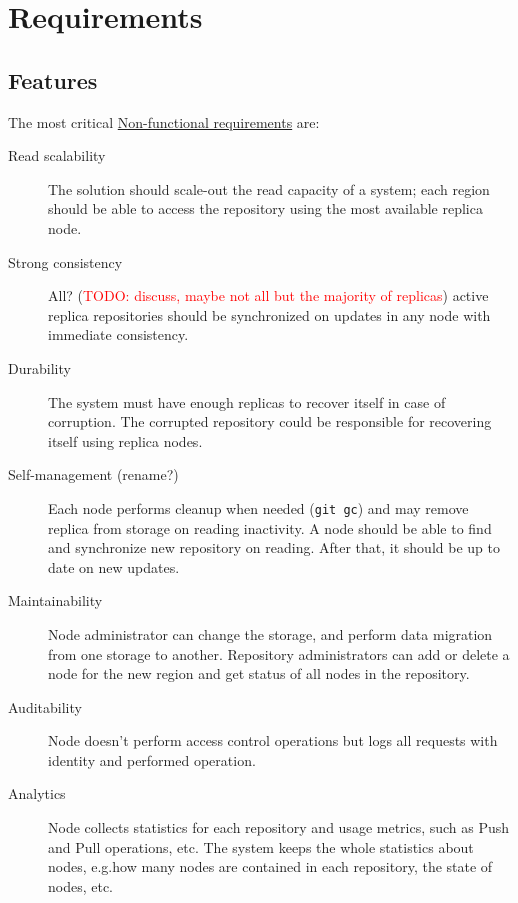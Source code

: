 \documentclass[acmlarge, screen, nonacm, 11pt]{acmart}
\newcommand{\code}[1]{\texttt{#1}}
\newcommand{\todo}[1]{\textcolor{red}{TODO: #1}}
\begin{document}


\section{Requirements}\label{sec:requirements}

\subsection{Features}\label{sec:features}

The most critical
\href{https://en.wikipedia.org/wiki/Non-functional_requirement}{Non-functional requirements}
are:

\begin{description}
  \item[Read scalability]
    The solution should scale-out the read capacity of a system; each region should be able
    to access the repository using the most available replica node.
  \item[Strong consistency]
    All? (\todo{discuss, maybe not all but the majority of replicas})
    active replica repositories should be synchronized on updates in any node
    with immediate consistency.
  \item[Durability]
    The system must have enough replicas to recover itself in case of corruption.
    The corrupted repository could be responsible for recovering itself using replica nodes.
  \item[Self-management (rename?)]
    Each node performs cleanup when needed (\code{git gc}) and may remove replica
    from storage on reading inactivity.
    A node should be able to find and synchronize new repository on reading. After that, it should be up to date on new updates.
  \item[Maintainability]
    Node administrator can change the storage, and perform data migration from one storage
    to another.
    Repository administrators can add or delete a node for the new region and
    get status of all nodes in the repository.
  \item[Auditability]
    Node doesn't perform access control operations but logs all
    requests with identity and performed operation.
  \item[Analytics]
    Node collects statistics for each repository and usage metrics, such as
    Push and Pull operations, etc. The system keeps the whole statistics about
    nodes, e.g.\@ how many nodes are contained in each repository, the state of nodes, etc.
\end{description}
\end{document}
